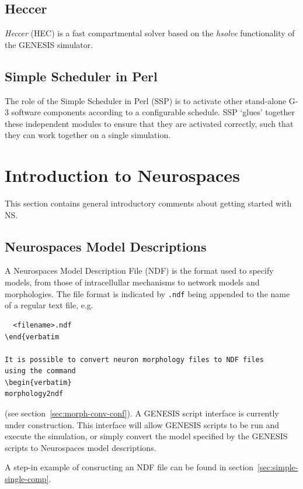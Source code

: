 \documentclass[12pt]{article}
\begin{document}
\subsection{Heccer}

{\it Heccer} (HEC) is a fast compartmental solver based on the {\it
  hsolve} functionality of the GENESIS simulator.

\subsection{Simple Scheduler in Perl}

The role of the Simple Scheduler in Perl (SSP) is to activate other
stand-alone G-3 software components according to a configurable
schedule. SSP `glues' together these independent modules to ensure
that they are activated correctly, such that they can work together on
a single simulation.
 
\section{Introduction to Neurospaces}

This section contains general introductory comments about getting
started with NS.

\subsection{Neurospaces Model Descriptions}

A Neurospaces Model Description File (NDF) is the format used to
specify models, from those of intracellullar mechanisms to network
models and morphologies.  The file format is indicated by {\tt .ndf}
being appended to the name of a regular text file, e.g.
\begin{verbatim}
  <filename>.ndf
\end{verbatim

It is possible to convert neuron morphology files to NDF files
using the command
\begin{verbatim}
morphology2ndf
\end{verbatim}
(see section~\ref{sec:morph-conv-conf}).  A GENESIS script interface is
currently under construction.  This interface will allow 
GENESIS scripts to be run and execute the simulation, or simply convert the
model specified by the GENESIS scripts to Neurospaces model
descriptions.

A step-in example of consructing an NDF file can
be found in section~\ref{sec:simple-single-comp}.
\end{document}
